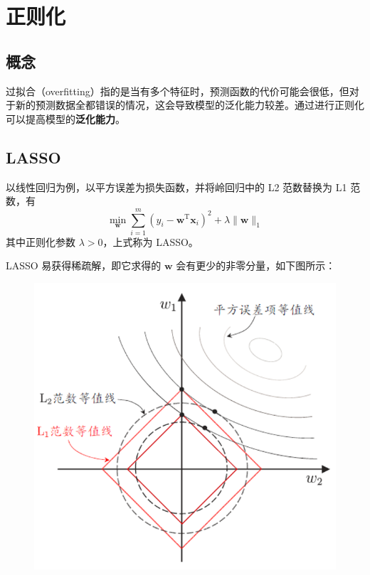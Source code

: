 \section{正则化}
\subsection{概念}
过拟合（overfitting）指的是当有多个特征时，预测函数的代价可能会很低，但对于新的预测数据全都错误的情况，这会导致模型的泛化能力较差。通过进行正则化可以提高模型的\textbf{泛化能力}。

\subsection{LASSO}

以线性回归为例，以平方误差为损失函数，并将岭回归中的 L2 范数替换为 L1 范数，有
\begin{equation}
    \min_{\boldsymbol{w}}\sum\limits_{i=1}^m{(y_i - \boldsymbol{w}^\mathrm T \boldsymbol{x}_i)^2 
    + \lambda \|\boldsymbol{w}\|_1}
\end{equation}
其中正则化参数 $\lambda > 0$，上式称为 LASSO。

LASSO 易获得稀疏解，即它求得的 $\boldsymbol{w}$ 会有更少的非零分量，如下图所示：
\begin{figure}[htbp]
    \centering\includegraphics[scale = 0.4]{LASSO.png}
\end{figure}

